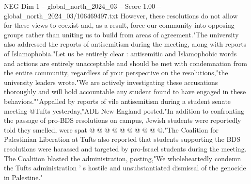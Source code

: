 \begin{textsample}{NEG Dim 1 – global\_north\_2024\_03 – Score 1.00 – global\_north\_2024\_03/106469497.txt}
However, these resolutions do not allow for these views to coexist and, as a result, force our community into opposing groups rather than uniting us to build from areas of agreement."The university also addressed the reports of antisemitism during the meeting, along with reports of Islamophobia."Let us be entirely clear : antisemitic and Islamophobic words and actions are entirely unacceptable and should be met with condemnation from the entire community, regardless of your perspective on the resolutions,"the university leaders wrote."We are actively investigating these accusations thoroughly and will hold accountable any student found to have engaged in these behaviors.""Appalled by reports of vile antisemitism during a student senate meeting @Tufts yesterday,"ADL New England posted."In addition to confronting the passage of pro-BDS resolutions on campus, Jewish students were reportedly told they smelled, were spat @ @ @ @ @ @ @ @ @ @."The Coalition for Palestinian Liberation at Tufts also reported that students supporting the BDS resolutions were harassed and targeted by pro-Israel students during the meeting.
The Coalition blasted the administration, posting,"We wholeheartedly condemn the Tufts administration ' s hostile and unsubstantiated dismissal of the genocide in Palestine."

\end{textsample}

